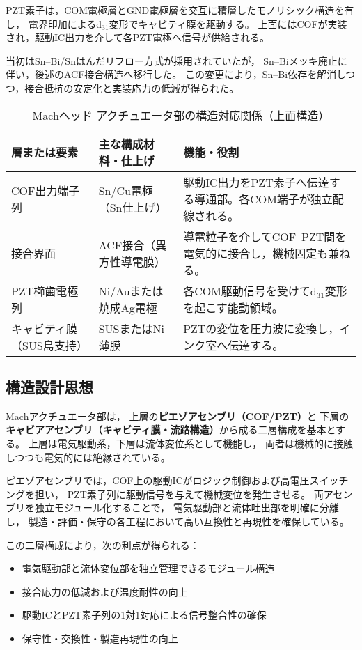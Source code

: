 \documentclass[conference]{IEEEtran}
\begin{document}
PZT素子は，COM電極層とGND電極層を交互に積層したモノリシック構造を有し，
電界印加によるd$_{31}$変形でキャビティ膜を駆動する。  
上面にはCOFが実装され，駆動IC出力を介して各PZT電極へ信号が供給される。  

当初はSn–Bi/Snはんだリフロー方式が採用されていたが，
Sn–Biメッキ廃止に伴い，後述のACF接合構造へ移行した。  
この変更により，Sn–Bi依存を解消しつつ，接合抵抗の安定化と実装応力の低減が得られた。  

\begin{table}[t]
\centering
\caption{Machヘッド アクチュエータ部の構造対応関係（上面構造）}
\footnotesize
\renewcommand{\arraystretch}{1.05}
\setlength{\tabcolsep}{3pt}
\begin{tabularx}{\columnwidth}{l l X}
\toprule
層または要素 & 主な構成材料・仕上げ & 機能・役割 \\
\midrule
COF出力端子列 & Sn/Cu電極（Sn仕上げ） & 駆動IC出力をPZT素子へ伝達する導通部。各COM端子が独立配線される。 \\
接合界面 & ACF接合（異方性導電膜） & 導電粒子を介してCOF–PZT間を電気的に接合し，機械固定も兼ねる。 \\
PZT櫛歯電極列 & Ni/Auまたは焼成Ag電極 & 各COM駆動信号を受けてd$_{31}$変形を起こす能動領域。 \\
キャビティ膜（SUS島支持） & SUSまたはNi薄膜 & PZTの変位を圧力波に変換し，インク室へ伝達する。 \\
\bottomrule
\end{tabularx}
\label{tab:mach_actuator_layers}
\end{table}

\subsection{構造設計思想}

Machアクチュエータ部は，
上層の\textbf{ピエゾアセンブリ（COF/PZT）}と
下層の\textbf{キャビアアセンブリ（キャビティ膜・流路構造）}から成る二層構成を基本とする。  
上層は電気駆動系，下層は流体変位系として機能し，
両者は機械的に接触しつつも電気的には絶縁されている。  

ピエゾアセンブリでは，COF上の駆動ICがロジック制御および高電圧スイッチングを担い，
PZT素子列に駆動信号を与えて機械変位を発生させる。  
両アセンブリを独立モジュール化することで，
電気駆動部と流体吐出部を明確に分離し，
製造・評価・保守の各工程において高い互換性と再現性を確保している。

この二層構成により，次の利点が得られる：
\begin{itemize}
  \item 電気駆動部と流体変位部を独立管理できるモジュール構造  
  \item 接合応力の低減および温度耐性の向上  
  \item 駆動ICとPZT素子列の1対1対応による信号整合性の確保  
  \item 保守性・交換性・製造再現性の向上  
\end{itemize}
\end{document}
